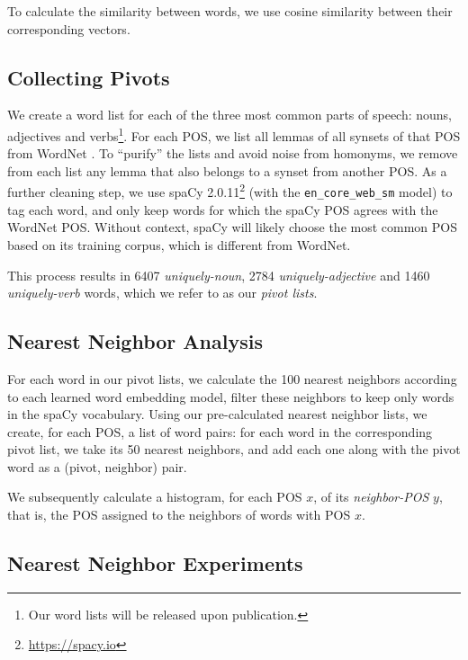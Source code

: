 \documentclass[11pt,a4paper]{article}
\begin{document}
    To calculate the similarity between words, we use cosine similarity
    between their corresponding vectors.
    	
    \subsection{Collecting Pivots}\label{sec:pivots}
    
    We create a word list for each of the three most
    common parts of speech:
    nouns, adjectives and verbs\footnote{Our word lists will be released upon publication.}.
    For each POS, we list all lemmas of all synsets of that POS from
    WordNet \cite{miller1998wordnet}.
    To ``purify'' the lists and avoid noise from homonyms,
    we remove from each list any lemma that also belongs to a synset from
    another POS.
    As a further cleaning step, we use
    spaCy 2.0.11\footnote{\url{https://spacy.io}} (with the \texttt{en\_core\_web\_sm} model)
    to tag each word,
    and only keep words for which the spaCy POS agrees with the WordNet POS.
    Without context, spaCy will likely choose the most
    common POS based on its training corpus, which is different from WordNet.
    
    This process results in 6407 \textit{uniquely-noun}, 2784 \textit{uniquely-adjective}
    and 1460 \textit{uniquely-verb} words, which we refer to as our \textit{pivot lists}.
    
    \subsection{Nearest Neighbor Analysis}\label{sec:nn_analysis}
    
    For each word in our pivot lists, we calculate the 100 nearest neighbors
    according to each learned word embedding model, filter these neighbors to
    keep only words in the spaCy vocabulary.
    Using our pre-calculated nearest neighbor lists, we create, for each
    POS, a list of word pairs: for each word in the corresponding pivot list,
    we take its 50 nearest neighbors, and add each one along with the pivot word
    as a (pivot, neighbor) pair.
    
    We subsequently calculate a histogram, for each POS $x$, of its
    \textit{neighbor-POS} $y$, that is, the POS assigned to the neighbors of
    words with POS $x$.
    
    \subsection{Nearest Neighbor Experiments}\label{sec:nn_exp}
    
\end{document}
